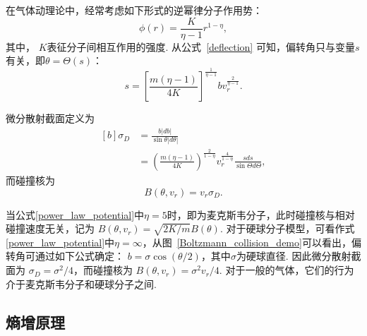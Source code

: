 

在气体动理论中，经常考虑如下形式的逆幂律分子作用势：
\begin{equation}\label{power_law_potential}
\phi(r)=\frac{K}{\eta-1}r^{1-\eta},
\end{equation}
其中， $K$表征分子间相互作用的强度.  从公式~\eqref{deflection} 可知，偏转角只与变量$s$有关，即$\theta=\Theta(s)$：
\begin{equation}\label{impact_norm}
s=\left[\frac{m(\eta-1)}{4K}\right]^{\frac{1}{\eta-1}}bv^{\frac{2}{\eta-1}}_r.
\end{equation}

微分散射截面定义为
\begin{equation}\label{DCS_chapter1}
\begin{aligned}[b]
\sigma_D&=\frac{b|db|}{\sin\theta|d\theta|}\\
&=\left(\frac{m(\eta-1)}{4K}\right)^{\frac{2}{1-\eta}}v^{\frac{4}{1-\eta}}_r
\frac{sds}{\sin\Theta{d\Theta}},
\end{aligned}
\end{equation}
而碰撞核为
\begin{equation}
B(\theta,v_r)=v_r \sigma_D.
\end{equation}


当公式\eqref{power_law_potential}中$\eta=5$时，即为麦克斯韦分子，此时碰撞核与相对碰撞速度无关，记为 $B(\theta,v_r)=\sqrt{2K/m}B(\theta)$. 
对于硬球分子模型，可看作式\eqref{power_law_potential}中$\eta=\infty $，从图~\ref{Boltzmann_collision_demo}可以看出，偏转角可通过如下公式确定：
$b=\sigma\cos\left({\theta}/{2}\right)$，其中$\sigma$为硬球直径. 因此微分散射截面为 $\sigma_D={{\sigma}^2}/{4}$，而碰撞核为 $B(\theta,{v}_r)={\sigma}^2v_r/4$.  对于一般的气体，它们的行为介于麦克斯韦分子和硬球分子之间. 




\subsection{熵增原理}


